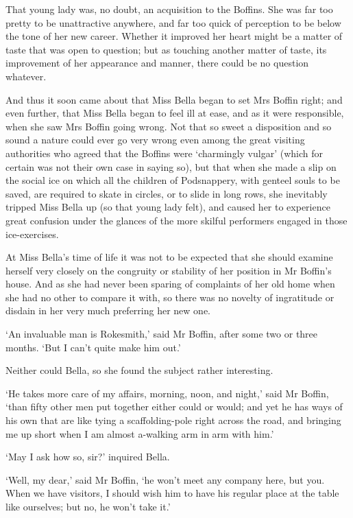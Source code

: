 That young lady was, no doubt, an acquisition to the Boffins. She
was far too pretty to be unattractive anywhere, and far too quick of
perception to be below the tone of her new career. Whether it improved
her heart might be a matter of taste that was open to question; but as
touching another matter of taste, its improvement of her appearance and
manner, there could be no question whatever.

And thus it soon came about that Miss Bella began to set Mrs Boffin
right; and even further, that Miss Bella began to feel ill at ease, and
as it were responsible, when she saw Mrs Boffin going wrong. Not that so
sweet a disposition and so sound a nature could ever go very wrong even
among the great visiting authorities who agreed that the Boffins were
‘charmingly vulgar’ (which for certain was not their own case in saying
so), but that when she made a slip on the social ice on which all the
children of Podsnappery, with genteel souls to be saved, are required to
skate in circles, or to slide in long rows, she inevitably tripped Miss
Bella up (so that young lady felt), and caused her to experience great
confusion under the glances of the more skilful performers engaged in
those ice-exercises.

At Miss Bella’s time of life it was not to be expected that she should
examine herself very closely on the congruity or stability of her
position in Mr Boffin’s house. And as she had never been sparing of
complaints of her old home when she had no other to compare it with,
so there was no novelty of ingratitude or disdain in her very much
preferring her new one.

‘An invaluable man is Rokesmith,’ said Mr Boffin, after some two or
three months. ‘But I can’t quite make him out.’

Neither could Bella, so she found the subject rather interesting.

‘He takes more care of my affairs, morning, noon, and night,’ said Mr
Boffin, ‘than fifty other men put together either could or would; and
yet he has ways of his own that are like tying a scaffolding-pole right
across the road, and bringing me up short when I am almost a-walking arm
in arm with him.’

‘May I ask how so, sir?’ inquired Bella.

‘Well, my dear,’ said Mr Boffin, ‘he won’t meet any company here, but
you. When we have visitors, I should wish him to have his regular place
at the table like ourselves; but no, he won’t take it.’

